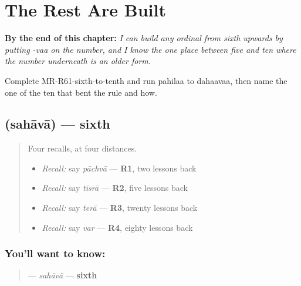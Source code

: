 
\chapter{The Rest Are Built}
\label{ch:mr-ordinals-sixth-to-tenth}

\begin{chapteropening}
\textbf{By the end of this chapter:} \emph{I can build any ordinal from sixth upwards by putting -vaa on the number, and I know the one place between five and ten where the number underneath is an older form.}

Complete MR-R61-sixth-to-tenth and run pahilaa to dahaavaa, then name the one of the ten that bent the rule and how.
\end{chapteropening}

\section[\texorpdfstring{\mr{सहावा} (sahāvā)}{सहावा (sahāvā)}]{ (sahāvā) — sixth}

\label{lesson:MR-C61-sahava}



\begin{quote}
Four recalls, at four distances.

\begin{itemize}
\raggedright
  \item \emph{Recall:} say \emph{pāchvā} — \textbf{R1}, two lessons back
  \item \emph{Recall:} say \emph{tisrā} — \textbf{R2}, five lessons back
  \item \emph{Recall:} say \emph{terā} — \textbf{R3}, twenty lessons back
  \item \emph{Recall:} say \emph{var} — \textbf{R4}, eighty lessons back
\end{itemize}
\end{quote}

\subsection*{You'll want to know: }
\begin{quote}
\textbf{} — \emph{sahāvā} — \textbf{sixth}
\end{quote}

